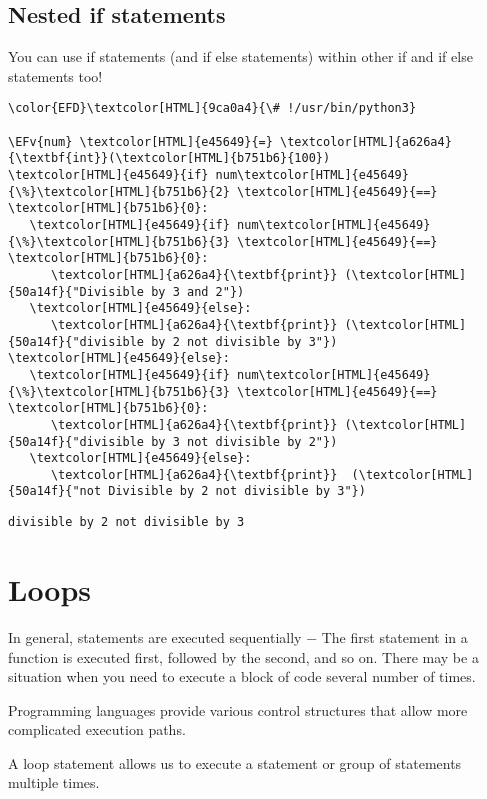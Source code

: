 \documentclass{scrartcl}
\newcommand{\EFv}[1]{\textcolor{EFv}{#1}} %
\begin{document}
\subsection{Nested if statements}
\label{sec:orgc64f3d8}
You can use if statements (and if else statements) within other if and if else
statements too!
\begin{Code}
\begin{Verbatim}[]
\color{EFD}\textcolor[HTML]{9ca0a4}{\# !/usr/bin/python3}

\EFv{num} \textcolor[HTML]{e45649}{=} \textcolor[HTML]{a626a4}{\textbf{int}}(\textcolor[HTML]{b751b6}{100})
\textcolor[HTML]{e45649}{if} num\textcolor[HTML]{e45649}{\%}\textcolor[HTML]{b751b6}{2} \textcolor[HTML]{e45649}{==} \textcolor[HTML]{b751b6}{0}:
   \textcolor[HTML]{e45649}{if} num\textcolor[HTML]{e45649}{\%}\textcolor[HTML]{b751b6}{3} \textcolor[HTML]{e45649}{==} \textcolor[HTML]{b751b6}{0}:
      \textcolor[HTML]{a626a4}{\textbf{print}} (\textcolor[HTML]{50a14f}{"Divisible by 3 and 2"})
   \textcolor[HTML]{e45649}{else}:
      \textcolor[HTML]{a626a4}{\textbf{print}} (\textcolor[HTML]{50a14f}{"divisible by 2 not divisible by 3"})
\textcolor[HTML]{e45649}{else}:
   \textcolor[HTML]{e45649}{if} num\textcolor[HTML]{e45649}{\%}\textcolor[HTML]{b751b6}{3} \textcolor[HTML]{e45649}{==} \textcolor[HTML]{b751b6}{0}:
      \textcolor[HTML]{a626a4}{\textbf{print}} (\textcolor[HTML]{50a14f}{"divisible by 3 not divisible by 2"})
   \textcolor[HTML]{e45649}{else}:
      \textcolor[HTML]{a626a4}{\textbf{print}}  (\textcolor[HTML]{50a14f}{"not Divisible by 2 not divisible by 3"})
\end{Verbatim}
\end{Code}

\begin{verbatim}
divisible by 2 not divisible by 3
\end{verbatim}

\section{Loops}
\label{sec:org9c33d74}
In general, statements are executed sequentially − The first statement in a function is executed first, followed by the second, and so on. There may be a situation when you need to execute a block of code several number of times.

Programming languages provide various control structures that allow more complicated execution paths.

A loop statement allows us to execute a statement or group of statements
multiple times.
\end{document}

